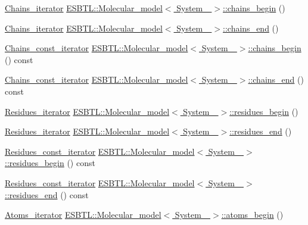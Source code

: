 \begin{DoxyCompactItemize}
\item 
\hyperlink{group__grp__iters_ga763cc293a5df9ae7dd6e31c198dce24b}{Chains\+\_\+iterator} \hyperlink{group__grp__iters_gaab272442c99d33d2f421a632fcee1569}{E\+S\+B\+T\+L\+::\+Molecular\+\_\+model$<$ System\+\_\+ $>$\+::chains\+\_\+begin} ()
\item 
\hyperlink{group__grp__iters_ga763cc293a5df9ae7dd6e31c198dce24b}{Chains\+\_\+iterator} \hyperlink{group__grp__iters_gac29bcba007d1b8b5d15de7e87ffe3e75}{E\+S\+B\+T\+L\+::\+Molecular\+\_\+model$<$ System\+\_\+ $>$\+::chains\+\_\+end} ()
\item 
\hyperlink{group__grp__iters_ga32c6b305275f21f3b184688be9d38ffd}{Chains\+\_\+const\+\_\+iterator} \hyperlink{group__grp__iters_ga50ff1b2b5446b4978ff4269732f6ae06}{E\+S\+B\+T\+L\+::\+Molecular\+\_\+model$<$ System\+\_\+ $>$\+::chains\+\_\+begin} () const
\item 
\hyperlink{group__grp__iters_ga32c6b305275f21f3b184688be9d38ffd}{Chains\+\_\+const\+\_\+iterator} \hyperlink{group__grp__iters_ga9ac120ccf9bf4752172e0013a5bca729}{E\+S\+B\+T\+L\+::\+Molecular\+\_\+model$<$ System\+\_\+ $>$\+::chains\+\_\+end} () const
\item 
\hyperlink{group__grp__iters_gae3b7c7057b27581b14109723b28a3abd}{Residues\+\_\+iterator} \hyperlink{group__grp__iters_ga8b8a40a8fd62a11dc2dd8c23dec80324}{E\+S\+B\+T\+L\+::\+Molecular\+\_\+model$<$ System\+\_\+ $>$\+::residues\+\_\+begin} ()
\item 
\hyperlink{group__grp__iters_gae3b7c7057b27581b14109723b28a3abd}{Residues\+\_\+iterator} \hyperlink{group__grp__iters_ga25b33f03211c67afab9abf005d2ceaa1}{E\+S\+B\+T\+L\+::\+Molecular\+\_\+model$<$ System\+\_\+ $>$\+::residues\+\_\+end} ()
\item 
\hyperlink{group__grp__iters_gab9417777a325c8ca02089328a4468703}{Residues\+\_\+const\+\_\+iterator} \hyperlink{group__grp__iters_ga0a02b98e1bdc627ffcf0ab01f1c82092}{E\+S\+B\+T\+L\+::\+Molecular\+\_\+model$<$ System\+\_\+ $>$\+::residues\+\_\+begin} () const
\item 
\hyperlink{group__grp__iters_gab9417777a325c8ca02089328a4468703}{Residues\+\_\+const\+\_\+iterator} \hyperlink{group__grp__iters_ga20e41a3080eaa3bd0904651871c2a511}{E\+S\+B\+T\+L\+::\+Molecular\+\_\+model$<$ System\+\_\+ $>$\+::residues\+\_\+end} () const
\item 
\hyperlink{group__grp__iters_ga458a89ea78f235b807ca0d2dfd9a0427}{Atoms\+\_\+iterator} \hyperlink{group__grp__iters_gac48ce4662bcb0dd1430309447f96422b}{E\+S\+B\+T\+L\+::\+Molecular\+\_\+model$<$ System\+\_\+ $>$\+::atoms\+\_\+begin} ()

\end{DoxyCompactItemize}
